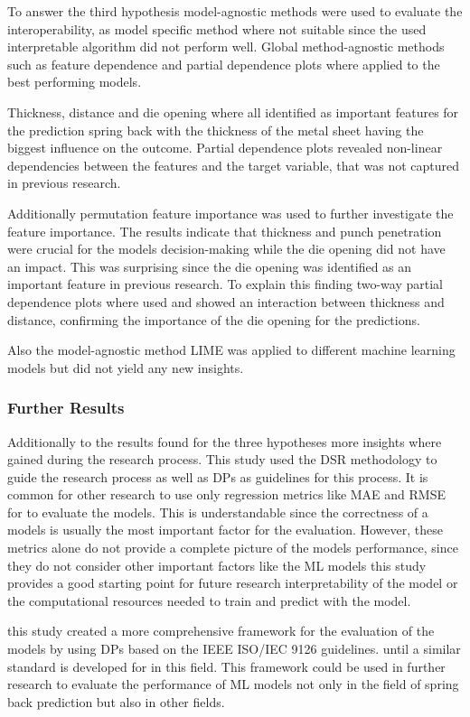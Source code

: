 To answer the third hypothesis model-agnostic methods were used to evaluate the interoperability, as model specific
method where not suitable since the used interpretable algorithm did not perform well.
Global method-agnostic methods such as feature dependence and partial dependence plots where applied to the best
performing models.

Thickness, distance and die opening where all identified as important features for the prediction spring back
with the
thickness of the metal sheet having the biggest influence on the outcome.
Partial dependence plots revealed non-linear dependencies between the features and the target variable, that was not
captured in previous research.

Additionally permutation feature importance was used to further investigate the feature importance.
The results indicate that thickness and punch penetration were crucial for the models decision-making while
the die opening did not have an impact.
This was surprising since the die opening was identified as an important feature in previous research.
To explain this finding two-way partial dependence plots where used and showed an interaction between thickness and
distance, confirming the importance of the die opening for the predictions.

Also the model-agnostic method LIME was applied to different machine learning models but did not yield any new
insights.


\subsubsection*{Further Results}
Additionally to the results found for the three hypotheses more insights where gained during the research process.
This study used the \ac{DSR} methodology to guide the research process as well as \ac{DP}s as guidelines
for
this process.
It is common for other research to use only regression metrics like MAE and RMSE for to evaluate the models.
This is understandable since the correctness of a models is usually the most important factor for the evaluation.
However, these metrics alone do not provide a complete picture of the models performance, since they do not consider
other important factors like the  \ac{ML} models this study provides a good starting point for future
research interpretability of the model or the computational resources needed to train and
predict with the model.

this study created a more comprehensive framework for the evaluation of the models by using \ac{DP}s
based on the IEEE ISO/IEC 9126 guidelines.
until a similar standard is developed for
in this field.
This framework could be used in further research to evaluate the performance of \ac{ML} models not only in the
field of
spring back prediction but also in other fields.

